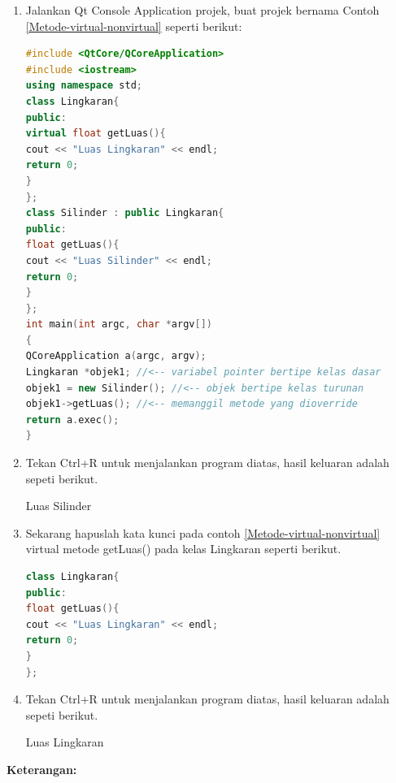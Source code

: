 \begin{enumerate}

\item
  Jalankan Qt Console Application projek, buat projek bernama Contoh \ref{Metode-virtual-nonvirtual}
  seperti berikut:

\begin{lstlisting}[language=c++, caption=Metode virtual dan non virtual, label=Metode-virtual-nonvirtual]
#include <QtCore/QCoreApplication>
#include <iostream>
using namespace std;
class Lingkaran{
public:
virtual float getLuas(){
cout << "Luas Lingkaran" << endl;
return 0;
}
};
class Silinder : public Lingkaran{
public:
float getLuas(){
cout << "Luas Silinder" << endl;
return 0;
}
};
int main(int argc, char *argv[])
{
QCoreApplication a(argc, argv);
Lingkaran *objek1; //<-- variabel pointer bertipe kelas dasar
objek1 = new Silinder(); //<-- objek bertipe kelas turunan
objek1->getLuas(); //<-- memanggil metode yang dioverride
return a.exec();
}
\end{lstlisting}
\item
  Tekan Ctrl+R untuk menjalankan program diatas, hasil keluaran adalah
  sepeti berikut.

\begin{lcverbatim}
Luas Silinder
\end{lcverbatim} 
\item
  Sekarang hapuslah kata kunci pada contoh \ref{Metode-virtual-nonvirtual} virtual metode getLuas() pada kelas
  Lingkaran seperti berikut.

\begin{lstlisting}[language=c++, caption=Menghapus methode getluas]
class Lingkaran{
public:
float getLuas(){
cout << "Luas Lingkaran" << endl;
return 0;
}
};
\end{lstlisting}
\item
  Tekan Ctrl+R untuk menjalankan program diatas, hasil keluaran adalah
  sepeti berikut.


\begin{lcverbatim}
Luas Lingkaran
\end{lcverbatim} 
\end{enumerate}
\textbf{Keterangan:}

